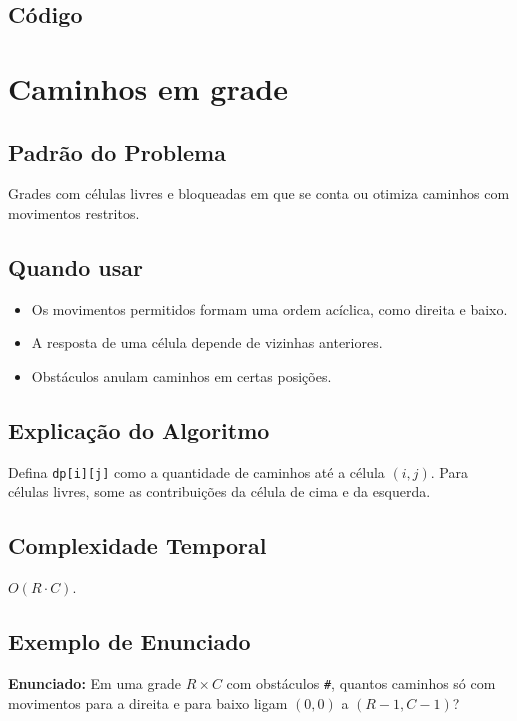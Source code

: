 \subsection{Código}

\section{Caminhos em grade}

\subsection{Padrão do Problema}
Grades com células livres e bloqueadas em que se conta ou otimiza caminhos com movimentos restritos.

\subsection{Quando usar}
\begin{itemize}[nosep]
  \item Os movimentos permitidos formam uma ordem acíclica, como direita e baixo.
  \item A resposta de uma célula depende de vizinhas anteriores.
  \item Obstáculos anulam caminhos em certas posições.
\end{itemize}

\subsection{Explicação do Algoritmo}
Defina \texttt{dp[i][j]} como a quantidade de caminhos até a célula $(i,j)$. Para células livres, some as contribuições da célula de cima e da esquerda.

\subsection{Complexidade Temporal}
$O(R \cdot C)$.

\subsection{Exemplo de Enunciado}
\begin{exemplodiabox}
\textbf{Enunciado:} Em uma grade $R \times C$ com obstáculos \texttt{\#}, quantos caminhos só com movimentos para a direita e para baixo ligam $(0,0)$ a $(R-1,C-1)$?
\end{exemplodiabox}

